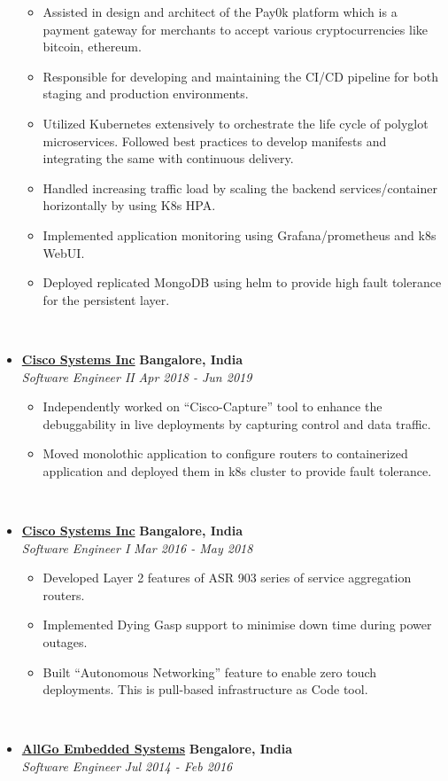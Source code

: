 \documentclass[11pt,a4paper]{article}
\begin{document}
\begin{itemize}
    \begin{itemize}[label=\textbullet]
      \itemsep0em
      \item Assisted in design and architect of the Pay0k platform which is a payment gateway for merchants to accept various cryptocurrencies like bitcoin, ethereum.
      \item Responsible for developing and maintaining the CI/CD pipeline for both staging and production environments.
      \item Utilized Kubernetes extensively to orchestrate the life cycle of polyglot microservices. Followed best practices to develop manifests and integrating the same with continuous delivery.
      \item Handled increasing traffic load by scaling the backend services/container horizontally by using K8s HPA.
      \item Implemented application monitoring using Grafana/prometheus and k8s WebUI.
      \item Deployed replicated MongoDB using helm to provide high fault tolerance for the persistent layer.
    \end{itemize}
\ \
    \item[]
    {\href{http://www.cisco.com}{\textbf{Cisco Systems Inc}} \hfill
      \textbf{Bangalore, India}}
    \\
    {\emph{Software Engineer II} \hfill \emph{Apr 2018 - Jun 2019}}

    \begin{itemize}[label=\textbullet]
      \itemsep0em
      \item Independently worked on “Cisco-Capture” tool to enhance the debuggability in live 
      deployments by capturing control and data traffic.
      \item Moved monolothic application to configure routers to containerized
      application and deployed them in k8s cluster to provide fault tolerance.
    \end{itemize}
\ \
    \item[]
    {\href{http://www.cisco.com}{\textbf{Cisco Systems Inc}} \hfill
      \textbf{Bangalore, India}}
    \\
    {\emph{Software Engineer I} \hfill \emph{Mar 2016 - May 2018}}

    \begin{itemize}[label=\textbullet]
      \itemsep0em
      \item Developed Layer 2 features of ASR 903 series
      of service aggregation routers.
      \item Implemented Dying Gasp support to minimise down time during power outages.
      \item Built “Autonomous Networking” feature to enable zero touch deployments. This is pull-based infrastructure as Code tool.
    \end{itemize}
\ \
    \item[]
    {\href{https://www.allgosystems.com/}{\textbf{AllGo Embedded Systems}} \hfill
      \textbf{Bengalore, India}}
    \\
    {\emph{Software Engineer} \hfill \emph{Jul 2014 - Feb 2016}}


\end{itemize}
\end{document}

